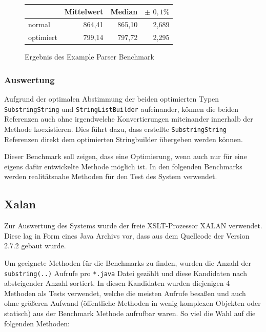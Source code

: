 \begin{figure}[H]
{	}

	
	\begin{table}[H]
	\centering
		\begin{tabular}{|l|r|r|r|}
			\hline
		   		 	  & Mittelwert & Median & \bf{$\pm$ $0,1\%$} \\
		 	\hline
		 	\hline
		 	normal    & 864,41 & 865,10 & 2,689 \\ 
		  	optimiert & 799,14 & 797,72 & 2,295 \\
		  	\hline
		  	
		\end{tabular}
	\end{table}

	\caption{Ergebnis des Example Parser Benchmark}\label{bp:exampleBench}
\end{figure}


\subsubsection{Auswertung}

Aufgrund der optimalen Abstimmung der beiden optimierten Typen \texttt{SubstringString} und
\texttt{StringListBuilder} aufeinander, können die beiden Referenzen auch ohne irgendwelche 
Konvertierungen miteinander innerhalb der Methode koexistieren. Dies führt dazu, dass
erstellte \texttt{SubstringString} Referenzen direkt dem optimierten Stringbuilder übergeben
werden können. 

Dieser Benchmark soll zeigen, dass eine Optimierung, wenn auch nur für eine eigens dafür 
entwickelte Methode möglich ist. In den folgenden Benchmarks werden realitätsnahe Methoden für 
den Test des System verwendet.
 
\subsection{Xalan}

Zur Auswertung des Systems wurde der freie XSLT-Prozessor XALAN verwendet. Diese lag in Form 
eines Java Archivs vor, dass aus dem Quellcode der Version 2.7.2 gebaut wurde. 

Um geeignete Methoden für die Benchmarks zu finden, wurden die Anzahl der \texttt{substring(..)}
Aufrufe pro \texttt{*.java} Datei gezählt und diese Kandidaten nach absteigender Anzahl sortiert.
In diesen Kandidaten wurden diejenigen 4 Methoden als Tests verwendet, welche die meisten 
Aufrufe besaßen und auch ohne größeren Aufwand (öffentliche Methoden in wenig komplexen Objekten 
oder statisch) aus der Benchmark Methode aufrufbar waren. So viel die Wahl auf die folgenden 
Methoden:

